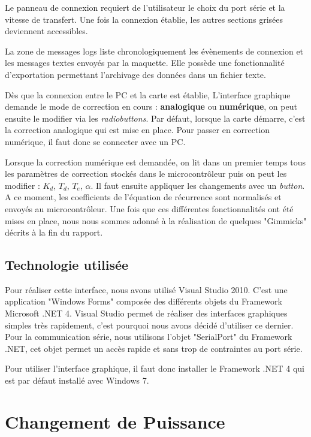\documentclass[11pt, french]{article} %
\begin{document}
Le panneau de connexion requiert de l'utilisateur le choix du port série et la vitesse de transfert. Une fois la connexion établie, les autres sections grisées deviennent accessibles. 

La zone de messages logs liste chronologiquement les évènements de connexion et les messages textes envoyés par la maquette. Elle possède une fonctionnalité d'exportation permettant l'archivage des données dans un fichier texte.

Dès que la connexion entre le PC et la carte est établie, L'interface graphique demande le mode de correction en cours :  \textbf{analogique} ou \textbf{numérique}, on peut ensuite le modifier via les \textit{radiobuttons}. 
Par défaut, lorsque la carte démarre, c'est la correction analogique qui est mise en place. Pour passer en correction numérique, il faut donc se connecter avec un PC.

Lorsque la correction numérique est demandée, on lit dans un premier temps tous les paramètres de correction stockés dans le microcontrôleur puis on peut les modifier : \textit{$K_d$}, \textit{$T_d$}, \textit{$T_e$}, \textit{$\alpha$}. Il faut ensuite appliquer les changements avec un \textit{button}. A ce moment, les coefficients de l'équation de récurrence sont normalisés et envoyés au microcontrôleur. Une fois que ces différentes fonctionnalités ont été mises en place, nous nous sommes adonné à la réalisation de quelques "Gimmicks" décrits à la fin du rapport.

\subsection{Technologie utilisée}
Pour réaliser cette interface, nous avons utilisé Visual Studio 2010. C'est une application "Windows Forms" composée des différents objets du Framework Microsoft .NET 4. Visual Studio permet de réaliser des interfaces graphiques simples très rapidement, c'est pourquoi nous avons décidé d'utiliser ce dernier. 
Pour la communication série, nous utilisons l'objet "SerialPort" du Framework .NET, cet objet permet un accès rapide et sans trop de contraintes au port série.

Pour utiliser l'interface graphique, il faut donc installer le Framework .NET 4 qui est par défaut installé avec Windows 7.

\section{Changement de Puissance}
\end{document}
